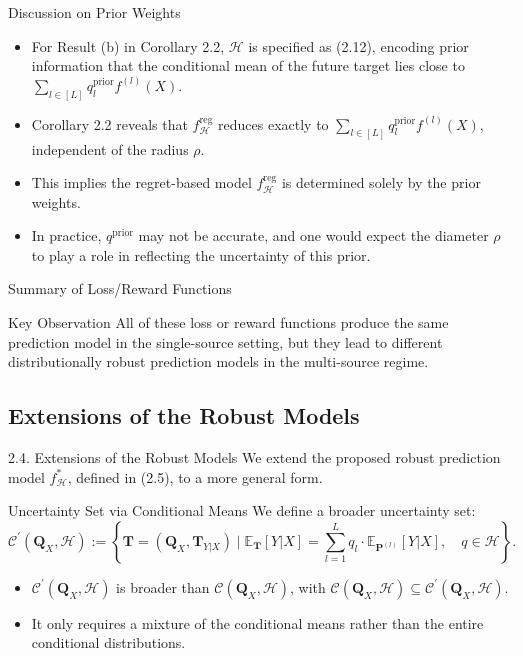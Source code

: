 \documentclass{beamer}
\begin{document}
\begin{frame}{Discussion on Prior Weights}
    \begin{itemize}
        \item For Result (b) in Corollary 2.2, $\mathcal{H}$ is specified as (2.12), encoding prior information that the conditional mean of the future target lies close to $\sum_{l \in [L]} q_{l}^{\mathrm{prior}} f^{(l)} (X)$.
        \item Corollary 2.2 reveals that $f_{\mathcal{H}}^{\mathrm{reg}}$ reduces exactly to $\sum_{l \in [L]} q_{l}^{\mathrm{prior}} f^{(l)} (X)$, independent of the radius $\rho$.
        \item This implies the regret-based model $f_{\mathcal{H}}^{\mathrm{reg}}$ is determined solely by the prior weights.
        \item In practice, $q^{\mathrm{prior}}$ may not be accurate, and one would expect the diameter $\rho$ to play a role in reflecting the uncertainty of this prior.
    \end{itemize}
\end{frame}

\begin{frame}{Summary of Loss/Reward Functions}
    \begin{block}{Key Observation}
        All of these loss or reward functions produce the same prediction model in the single-source setting, but they lead to different distributionally robust prediction models in the multi-source regime.
    \end{block}
\end{frame}

\subsection{Extensions of the Robust Models}

\begin{frame}{2.4. Extensions of the Robust Models}
    We extend the proposed robust prediction model $f_{\mathcal{H}}^{*}$, defined in (2.5), to a more general form.
    \begin{block}{Uncertainty Set via Conditional Means}
        We define a broader uncertainty set:
        \begin{equation*}
            \mathcal{C}^{\prime}(\mathbf{Q}_{X}, \mathcal{H}) := \left\{\mathbf{T} = (\mathbf{Q}_{X}, \mathbf{T}_{Y | X}) \mid \mathbb{E}_{\mathbf{T}} [ Y | X ] = \sum_{l = 1}^{L} q_{l} \cdot \mathbb{E}_{\mathbf{P}^{(l)}} [ Y | X ], \quad q \in \mathcal{H} \right\}. \tag{2.13}
        \end{equation*}
    \end{block}
    \begin{itemize}
        \item $\mathcal{C}^{\prime}(\mathbf{Q}_{X}, \mathcal{H})$ is broader than $\mathcal{C}(\mathbf{Q}_{X}, \mathcal{H})$, with $\mathcal{C}(\mathbf{Q}_{X}, \mathcal{H}) \subseteq \mathcal{C}^{\prime}(\mathbf{Q}_{X}, \mathcal{H})$.
        \item It only requires a mixture of the conditional means rather than the entire conditional distributions.
    \end{itemize}
\end{frame}
\end{document}
